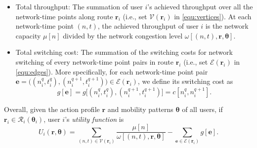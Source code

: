 \documentclass[journal]{IEEEtran}
\newcommand{\mc}[1]{\mathcal{#1}}
\newcommand{\bs}[1]{\boldsymbol{#1}}
\begin{document}
	
\begin{itemize}
	\item Total throughput: The summation of user $i$'s achieved throughput over all the network-time points along route $\bs{r}_i$ (i.e., set $\mathcal{V}(\boldsymbol{r}_i)$ in \eqref{equ:vertices}). At each network-time point $(n, t)$, the achieved throughput of user $i$ is the network capacity $\mu[n]$ divided by the network congestion level $\omega[(n, t), \boldsymbol{r}, \boldsymbol{\theta}]$. %
	
	\item Total switching cost: The summation of the switching costs for network switching of every network-time point pairs in route $\boldsymbol{r}_i$ (i.e., set $\mathcal{E}(\boldsymbol{r}_i)$ in \eqref{equ:edges}). %
	More specifically, for each network-time point pair $\boldsymbol{e} = \bigl( (n_i^{q},t_i^{q}),(n_i^{q+1},t_i^{q+1}) \bigr) \in \mathcal{E}(\boldsymbol{r}_i)$, we define its switching cost as
%
\begin{equation}
	g[\boldsymbol{e}] = g \bigl[ (n_i^{q},t_i^{q}),(n_i^{q+1},t_i^{q+1}) \bigr] = c[n_i^{q},n_i^{q+1}].
\end{equation}
% 	
\end{itemize}	
%

  Overall, given the action profile $\boldsymbol{r}$ and mobility patterns $\boldsymbol{\theta}$ of all users, if $\boldsymbol{r}_i \in \mathcal{R}_i(\boldsymbol{\theta}_i)$, user $i$'s \emph{utility function} is %
%
\begin{equation} \label{equ:utility_route}
	U_i(\boldsymbol{r},\boldsymbol{\theta}) = \displaystyle\sum_{(n,t) \in \mc{V}(\boldsymbol{r}_i)} \frac{\mu[n]}{\omega[(n, t), \boldsymbol{r}, \boldsymbol{\theta}]} - \sum_{\boldsymbol{e} \in \mathcal{E}(\boldsymbol{r}_i)} g[\boldsymbol{e}].
\end{equation}
% 		
\end{document}
